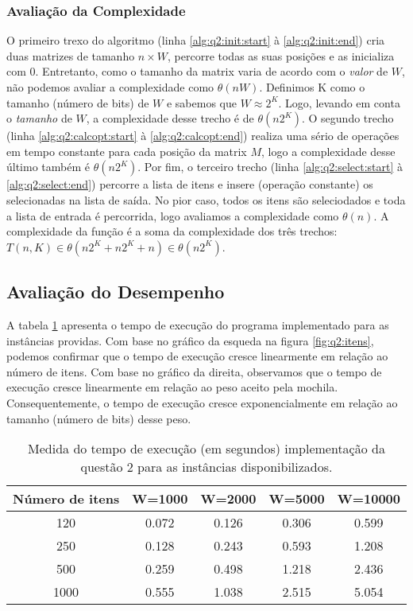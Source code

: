 \documentclass[a4paper]{article}
\newcommand{\algsection}[2]{(linha \ref{alg:#1:#2:start} à \ref{alg:#1:#2:end})}
\begin{document}
\subsubsection{Avaliação da Complexidade}

O primeiro trexo do algoritmo \algsection{q2}{init} cria duas matrizes de tamanho $n \times W$, percorre todas as suas posições e as inicializa com 0. Entretanto, como o tamanho da matrix varia de acordo com o \emph{valor} de $W$, não podemos avaliar a complexidade como $\theta(nW)$. Definimos K como o tamanho (número de bits) de $W$ e sabemos que $W \approx 2^K$. Logo, levando em conta o \emph{tamanho} de $W$, a complexidade desse trecho é de $\theta(n2^K)$. O segundo trecho \algsection{q2}{calcopt} realiza uma sério de operações em tempo constante para cada posição da matrix $M$, logo a complexidade desse último também é $\theta(n2^K)$. Por fim, o terceiro trecho \algsection{q2}{select} percorre a lista de itens e insere (operação constante) os selecionadas na lista de saída. No pior caso, todos os itens são seleciodados e toda a lista de entrada é percorrida, logo avaliamos a complexidade como $\theta(n)$. A complexidade da função é a soma da complexidade dos três trechos: $T(n, K) \in \theta(n2^K + n2^K + n) \in \theta(n2^K)$.

\subsection{Avaliação do Desempenho}

A tabela \ref{tab:q2:bench} apresenta o tempo de execução do programa implementado para as instâncias providas.
Com base no gráfico da esqueda na figura \ref{fig:q2:itens}, podemos confirmar que o tempo de execução cresce linearmente em relação ao número de itens. Com base no gráfico da direita, observamos que o tempo de execução cresce linearmente em relação ao peso aceito pela mochila. Consequentemente, o tempo de execução cresce exponencialmente em relação ao tamanho (número de bits) desse peso.

\begin{table}[H]
\centering
\begin{tabular}{c|c|c|c|c}
Número de itens & W=1000 & W=2000 & W=5000 & W=10000 \\
\hline
120 & 0.072 & 0.126 & 0.306 & 0.599 \\
250 & 0.128 & 0.243 & 0.593 & 1.208 \\
500 & 0.259 & 0.498 & 1.218 & 2.436 \\
1000 & 0.555 & 1.038 & 2.515 & 5.054 \\
\end{tabular}
\caption{Medida do tempo de execução (em segundos) implementação da questão 2 para as instâncias disponibilizados.}
\label{tab:q2:bench}
\end{table}
\end{document}
